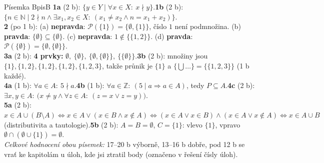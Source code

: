 \documentclass[10pt,a4paper]{article}
\newcommand{\N}{\mathbb N}
\newcommand{\Z}{\mathbb Z}
\newcommand{\pr}{\mathrel{\mid}}
\newcommand{\nepr}{\mathrel{\nmid}}
\newcommand{\sm}{\setminus}
\newcommand{\pravda}{\textcolor{good}{\sffamily\bfseries pravda}\xspace}
\newcommand{\nepravda}{\textcolor{warn}{\sffamily\bfseries nepravda}\xspace}
\begin{document}
\begin{reseni}{Písemka B}{pisB}
\textbf{1a} (2 b): $\{y\in Y\mid\forall x\in X:\ x\nepr y\}$.\quad \textbf{1b} (2 b): $\{n\in\N\mid 2\nepr n\land\exists x_1,x_2\in X:\ (x_1\neq x_2\land n=x_1+x_2)\}$.\\
\textbf{2} (po 1 b): (a) \nepravda: $\mathcal P(\{1\})=\{\emptyset,\{1\}\}$, číslo $1$ není podmnožina. (b) \pravda: $\{\emptyset\}\subseteq\{\emptyset\}$. (c) \nepravda: $1\notin\{\{1,2\}\}$. (d) \pravda: $\mathcal P(\{\emptyset\})=\{\emptyset,\{\emptyset\}\}$.\\
\textbf{3a} (2 b): \textbf{4 prvky:} $\emptyset,\ \{\emptyset\},\ \{\emptyset,\{\emptyset\}\},\ \{\{\emptyset\}\}$.\quad \textbf{3b} (2 b): množiny jsou $\{1\},\{1,2\},\{1,2\},\{1,2\},\{1,2,3\}$, takže průnik je $\{1\}$ a $\{\bigcup\dots\}=\{\{1,2,3\}\}$ (1 b každé).\\
\textbf{4a} (1 b): $\forall a\in A:\ 5\nepr a$.\quad \textbf{4b} (1 b): $\forall a\in\Z:\ (5\pr a\Rightarrow a\in A)$, tedy $P\subseteq A$.\quad \textbf{4c} (2 b): $\exists x,y\in A:\ \big(x\neq y\land\forall z\in A:\ (z=x\lor z=y)\big)$.\\
\textbf{5a} (2 b): $x\in A\cup(B\sm A)\iff x\in A\lor(x\in B\land x\notin A)\iff(x\in A\lor x\in B)\land(x\in A\lor x\notin A)\iff x\in A\cup B$ (distributivita a tautologie).\quad \textbf{5b} (2 b): $A=B=\emptyset$, $C=\{1\}$: vlevo $\{1\}$, vpravo $\emptyset\cap(\emptyset\cup\{1\})=\emptyset$.\\[2pt]
\emph{Celkové hodnocení obou písemek:} 17--20 b výborně, 13--16 b dobře, pod 12 b se vrať ke kapitolám u úloh, kde jsi ztratil body (označeno v řešení čísly úloh).
\end{reseni}
\end{document}
